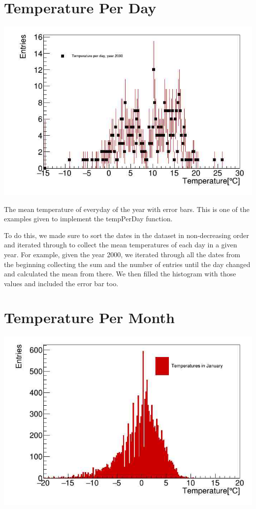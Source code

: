 \documentclass{article}
\begin{document}
\section{Temperature Per Day}
\begin{center}
\includegraphics[scale=0.5]{tempPerDay}
\end{center}

The mean temperature of everyday of the year with error bars. 
This is one of the examples given to implement the tempPerDay function.

To do this, we made sure to sort the dates in the dataset in non-decreasing 
order and iterated through to collect the mean temperatures of each day 
in a given year. For example, given the year 2000, we iterated through all 
the dates from the beginning collecting the sum and the number of entries
until the day changed and calculated the mean from there. We then filled the histogram with those values and included the error bar too. 


\section{Temperature Per Month}
\begin{center}
\includegraphics[scale=0.5]{tempPerMonth}
\end{center}
\end{document}
